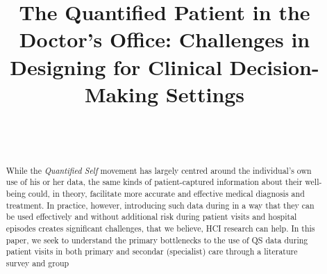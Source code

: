 \documentclass{sigchi}
\begin{document}
\title{The Quantified Patient in the Doctor's Office: Challenges in Designing for Clinical Decision-Making Settings}


\author{%
  \\
  \\
}

\maketitle

\begin{abstract}
While the \emph{Quantified Self} movement has largely centred around the individual’s own use of his or her data, the same kinds of patient-captured information about their well-being could, in theory, facilitate more accurate and effective medical diagnosis and treatment.  In practice, however, introducing such data during in a way that they can be used effectively and without additional risk during patient visits and hospital episodes creates significant challenges, that we believe, HCI research can help.  In this paper, we seek to understand the primary bottlenecks to the use of QS data during patient visits in both primary and secondar (specialist) care through a literature survey and group 

\end{abstract}
\end{document}
